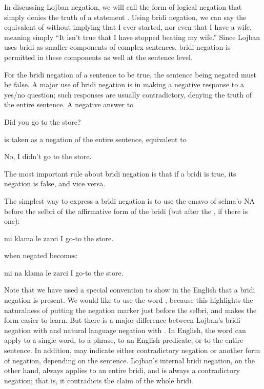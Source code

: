 In discussing Lojban negation, we will call the form of
    logical negation that simply denies the truth of a statement
    . Using bridi negation, we can say the
    equivalent of  without
    implying that I ever started, nor even that I have a wife,
    meaning simply ``It isn't true that I have stopped beating my
    wife.'' Since Lojban uses bridi as smaller components of
    complex sentences, bridi negation is permitted in these
    components as well at the sentence level.

For the bridi negation of a sentence to be true, the
    sentence being negated must be false. A major use of bridi
    negation is in making a negative response to a yes/no question;
    such responses are usually contradictory, denying the truth of
    the entire sentence. A negative answer to
\begin{example}
Did you go to the store?
\end{example}

{\noindent}is taken as a negation of the entire sentence, equivalent to
\begin{example}
No, I didn't go to the store.
\end{example}

The most important rule about bridi negation is that if a
    bridi is true, its negation is false, and vice versa.

The simplest way to express a bridi negation is to use the
    cmavo  of selma'o NA before the selbri of the affirmative
    form of the bridi (but after the , if there is one):
\begin{example}
mi klama le zarci\n
I go-to the store.
\end{example}

{\noindent}when negated becomes:
\begin{example}
mi na klama le zarci\n
I  go-to the store.
\end{example}

Note that we have used a special convention to show in the
    English that a bridi negation is present. We would like to use
    the word , because this highlights the naturalness of
    putting the negation marker just before the selbri, and makes
    the form easier to learn. But there is a major difference
    between Lojban's bridi negation with  and natural
    language negation with . In English, the word 
    can apply to a single word, to a phrase, to an English
    predicate, or to the entire sentence. In addition,  may
    indicate either contradictory negation or another form of
    negation, depending on the sentence. Lojban's internal bridi
    negation, on the other hand, always applies to an entire bridi,
    and is always a contradictory negation; that is, it contradicts
    the claim of the whole bridi.

